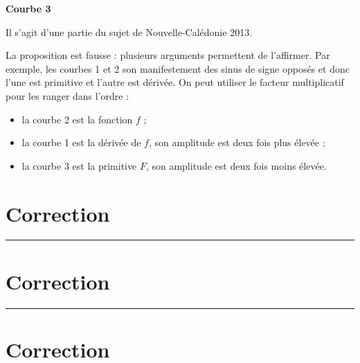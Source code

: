 \documentclass[12pt,a4paper,french]{article}
\theoremstyle{break}
\theoremstyle{plain}
\theoremstyle{nonumberplain}
\theoremstyle{nonumberbreak}
\begin{document}
\begin{question}[ID=trigonometrie;bac;Nouvelle-Caledonie;2013]
  \textbf{Courbe 3}


  \blank[style=dotted,width=6\linewidth,linespread=1.7]{}

  \blank[style=dotted,width=6\linewidth,linespread=1.7]{}

  \blank[style=dotted,width=6\linewidth,linespread=1.7]{}

  \blank[style=dotted,width=8\linewidth,linespread=1.7]{}


\end{question}
\begin{solution}
  Il s'agit d'une partie du sujet de Nouvelle-Calédonie 2013.

  La proposition est fausse : plusieurs arguments permettent de
  l'affirmer. Par exemple, les courbes 1 et 2 son manifestement des
  sinus de signe opposés et donc l'une est primitive et l'autre est
  dérivée. On peut utiliser le facteur multiplicatif pour les ranger
  dans l'ordre :
  \begin{itemize}
    \item la courbe 2 est la fonction $f$ ;
    \item la courbe 1 est la dérivée de $f$, son amplitude est deux fois
      plus élevée ;
    \item la courbe 3 est la primitive $F$, son amplitude est deux fois
      moins élevée.
  \end{itemize}
\end{solution}


\newpage
\section*{Correction}
\printsolutions
\vfill
\hrule
\vfill
\section*{Correction}
\printsolutions
\vfill
\hrule
\vfill
\section*{Correction}
\printsolutions
\end{document}
